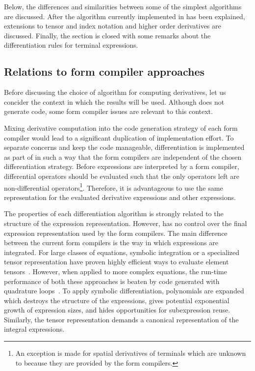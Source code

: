 Below, the differences and similarities between some of the simplest
algorithms are discussed.  After the algorithm currently implemented
in \ufl{} has been explained, extensions to tensor and index notation
and higher order derivatives are discussed.  Finally, the section is
closed with some remarks about the differentiation rules for terminal
expressions.

\subsection{Relations to form compiler approaches}
\label{ufl:sec:fcrel}

Before discussing the choice of algorithm for computing derivatives,
let us concider the context in which the results will be used.
Although \ufl{} does not generate code, some form compiler issues are
relevant to this context.

Mixing derivative computation into the code generation strategy of
each form compiler would lead to a significant duplication of
implementation effort.  To separate concerns and keep the code
manageable, differentiation is implemented as part of \ufl{} in such a
way that the form compilers are independent of the chosen
differentiation strategy.  Before expressions are interpreted by a
form compiler, differential operators should be evaluated such that
the only operators left are non-differential operators\footnote{An
  exception is made for spatial derivatives of terminals which are
  unknown to \ufl{} because they are provided by the form compilers.}.
Therefore, it is advantageous to use the same representation for the
evaluated derivative expressions and other expressions.

The properties of each differentiation algorithm is strongly related
to the structure of the expression representation.  However, \ufl{}
has no control over the final expression representation used by the
form compilers.  The main difference between the current form
compilers is the way in which expressions are integrated.  For large
classes of equations, symbolic integration or a specialized tensor
representation have proven highly efficient ways to evaluate element
tensors~\cite{AlnMar2009,KirLog2006,KirLog2007}.  However, when
applied to more complex equations, the run-time performance of both
these approaches is beaten by code generated with quadrature
loops~\cite{AlnMar2009,OelWel2009}.  To apply symbolic
differentiation, polynomials are expanded which destroys the structure
of the expressions, gives potential exponential growth of expression
sizes, and hides opportunities for subexpression reuse.  Similarly,
the tensor representation demands a canonical representation of the
integral expressions.

